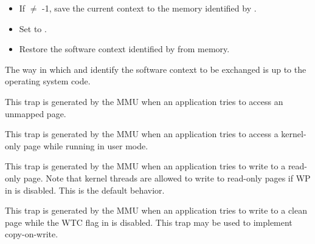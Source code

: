 \begin{itemize}
\item If  $\neq$ -1, save the current context to the memory
identified by .
\item Set  to .
\item Restore the software context identified by  from memory.
\end{itemize}

The way in which  and  identify the software context to be
exchanged is up to the operating system code.



This trap is generated by the MMU when an application tries to access an
unmapped page.



This trap is generated by the MMU when an application tries to access a
kernel-only page while running in user mode.



This trap is generated by the MMU when an application tries to write to a
read-only page. Note that kernel threads are allowed to write to read-only
pages if WP in  is disabled. This is the default behavior.



This trap is generated by the MMU when an application tries to write to a clean
page while the WTC flag in  is disabled. This trap may be used to
implement copy-on-write.


